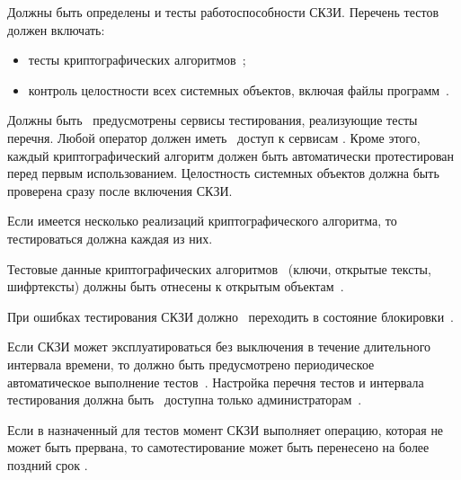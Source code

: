\label{R.ST.Tests}
Должны быть определены и 
тесты работоспособности СКЗИ.
Перечень тестов должен включать:
\begin{itemize}
\item
тесты криптографических алгоритмов~;
\item
контроль целостности всех системных объектов, включая файлы 
программ~.
\end{itemize}
Должны быть~ предусмотрены сервисы тестирования, реализующие
тесты перечня. Любой оператор должен иметь~ доступ к 
сервисам .
%
Кроме этого, каждый криптографический алгоритм должен быть автоматически 
протестирован перед первым использованием.
%
Целостность системных объектов должна быть проверена сразу после включения 
СКЗИ.

\begin{note}
Если имеется несколько реализаций криптографического алгоритма, 
то тестироваться должна каждая из них.
\end{note}

\label{R.ST.TestData}
Тестовые данные криптографических алгоритмов~ 
(ключи, открытые тексты, шифртексты) 
должны быть отнесены к открытым объектам~.

\label{R.ST.TestLock}
При ошибках тестирования СКЗИ должно~ 
переходить в состояние блокировки~.


\label{R.ST.Periodic}
Если СКЗИ может эксплуатироваться без выключения в течение длительного интервала
времени, то должно быть предусмотрено периодическое автоматическое выполнение 
тестов~. Настройка перечня тестов и интервала тестирования
должна быть~ доступна только 
администраторам~.

\begin{note}
Если в назначенный для тестов момент СКЗИ выполняет операцию, которая не может 
быть прервана, то самотестирование может быть перенесено на более поздний срок
.
\end{note} 
